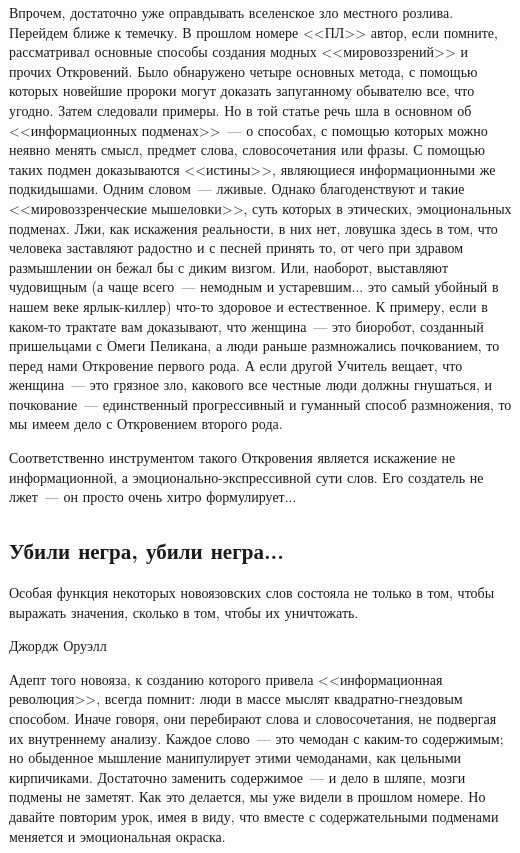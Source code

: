\documentclass{scrbook}
\makeatletter
\newcommand{\defaultepigraphwidth}{0.5} %
\newcommand{\flqq}{<<}
\newcommand{\frqq}{>>}
\newcommand{\mdash}{~--- }
\newcommand{\essaysection}[1]{\subsection*{#1}\nopagebreak}
\newcommand{\myepigraph}[3][\@empty]{
	\ifx\@empty#1
		\setlength{\epigraphwidth}{\defaultepigraphwidth\textwidth}
	\else
		\setlength{\epigraphwidth}{#1\textwidth}
	\fi
	\epigraph{#2}{#3}
	\setlength{\epigraphwidth}{\defaultepigraphwidth\textwidth} %
	\nopagebreak
}
\makeatother
\begin{document}
Впрочем, достаточно уже оправдывать вселенское зло местного розлива. Перейдем ближе к темечку. В прошлом номере {\flqq}ПЛ{\frqq} автор, если помните, рассматривал основные способы создания модных {\flqq}мировоззрений{\frqq} и прочих Откровений. Было обнаружено четыре основных метода, с помощью которых новейшие пророки могут доказать запуганному обывателю все, что угодно. Затем следовали примеры. Но в той статье речь шла в основном об {\flqq}информационных подменах{\frqq}{\mdash}о способах, с помощью которых можно неявно менять смысл, предмет слова, словосочетания или фразы. С помощью таких подмен доказываются {\flqq}истины{\frqq}, являющиеся информационными же подкидышами. Одним словом{\mdash}лживые. Однако благоденствуют и такие {\flqq}мировоззренческие мышеловки{\frqq}, суть которых в этических, эмоциональных подменах. Лжи, как искажения реальности, в них нет, ловушка здесь в том, что человека заставляют радостно и с песней принять то, от чего при здравом размышлении он бежал бы с диким визгом. Или, наоборот, выставляют чудовищным (а чаще всего{\mdash}немодным и устаревшим... это самый убойный в нашем веке ярлык-киллер) что-то здоровое и естественное. К примеру, если в каком-то трактате вам доказывают, что женщина{\mdash}это биоробот, созданный пришельцами с Омеги Пеликана, а люди раньше размножались почкованием, то перед нами Откровение первого рода. А если другой Учитель вещает, что женщина{\mdash}это грязное зло, какового все честные люди должны гнушаться, и почкование{\mdash}единственный прогрессивный и гуманный способ размножения, то мы имеем дело с Откровением второго рода.

Соответственно инструментом такого Откровения является искажение не информационной, а эмоционально-экспрессивной сути слов. Его создатель не лжет{\mdash}он просто очень хитро формулирует...

\essaysection{Убили негра, убили негра...}

\myepigraph{Особая функция некоторых новоязовских слов состояла не только в том, чтобы выражать значения, сколько в том, чтобы их уничтожать.}
{Джордж Оруэлл}

Адепт того новояза, к созданию которого привела {\flqq}информационная революция{\frqq}, всегда помнит: люди в массе мыслят квадратно-гнездовым способом. Иначе говоря, они перебирают слова и словосочетания, не подвергая их внутреннему анализу. Каждое слово{\mdash}это чемодан с каким-то содержимым; но обыденное мышление манипулирует этими чемоданами, как цельными кирпичиками. Достаточно заменить содержимое{\mdash}и дело в шляпе, мозги подмены не заметят. Как это делается, мы уже видели в прошлом номере. Но давайте повторим урок, имея в виду, что вместе с содержательными подменами меняется и эмоциональная окраска.
\end{document}
